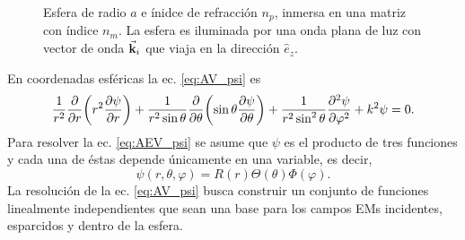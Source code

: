 \documentclass[letterpaper,11pt] {article}
\begin{document}
\begin{figure}[t!]
\begin{minipage}[c]{.95\linewidth}
		\caption{ Esfera de radio $a$ e ínidce de refracción $n_p$, inmersa en una matriz con índice $n_m$. La esfera es iluminada por una onda plana de luz con vector de onda $\va{k}_i$ que viaja en la dirección $\hat{e}_z$.}\label{fig:EsferaA}
	\end{minipage}
	\end{figure}
	
En coordenadas esféricas la ec. \eqref{eq:AV_psi} es
	\begin{equation}
	\frac{1}{r^2} \pdv{r}\qty(r^2\pdv{\psi}{r})+ 
	\frac{1}{r^2\sin\theta}\pdv{\theta}\qty(\sin\theta\pdv{\psi}{\theta})
	 + \frac{1}{r^2\sin^2\theta}\pdv[2]{\psi}{\varphi} + k^2 \psi =0. \label{eq:AEV_psi}
	\end{equation}
Para resolver la ec. \eqref{eq:AEV_psi} se asume que $\psi$ es el producto de tres funciones y cada una de éstas depende únicamente en una variable, es decir,
	\begin{equation}
	\psi (r,\theta, \varphi) = R(r)\Theta(\theta) \Phi(\varphi). \label{eq:psiEsf}
	\end{equation}
La resolución de la ec. \eqref{eq:AV_psi} busca construir un conjunto de funciones linealmente independientes que sean una base para los campos EMs incidentes, esparcidos y dentro de la esfera.\\
\end{document}
